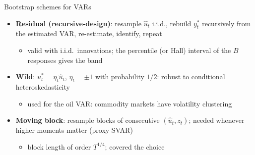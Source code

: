 \begin{frame}{Bootstrap schemes for VARs}
\itemsize{\small}
\begin{itemize}
    \item \textbf{Residual (recursive-design)}: resample $\hat u_t$ i.i.d., rebuild $y^*_t$ recursively from the estimated VAR, re-estimate, identify, repeat
    \begin{itemize}
        \item valid with i.i.d.\ innovations; the percentile (or Hall) interval of the $B$ responses gives the band
    \end{itemize}
    \item \textbf{Wild}: $u^*_t = \eta_t\hat u_t$, $\eta_t = \pm1$ with probability $1/2$: robust to conditional heteroskedasticity 
    \begin{itemize}
        \item used for the oil VAR: commodity markets have volatility clustering
    \end{itemize}
    \item \textbf{Moving block}: resample blocks of consecutive $(\hat u_t, z_t)$; needed whenever higher moments matter (proxy SVAR) 
    \begin{itemize}
        \item block length of order $T^{1/4}$;  covered the choice
    \end{itemize}
\end{itemize}
\end{frame}


